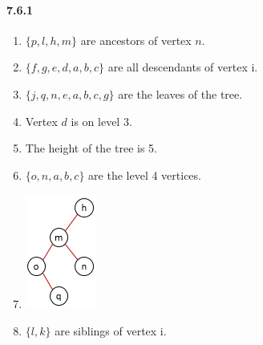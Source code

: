 \documentclass[11pt, letterpaper, twocolumn, fleqn]{article}
\begin{document}
\paragraph{7.6.1}
\begin{enumerate}
  \item $\{p,l,h,m\}$ are ancestors of vertex $n$.
  \item $\{f,g,e,d,a,b,c\}$ are all descendants of vertex i.
  \item $\{j,q,n,e,a,b,c,g\}$ are the leaves of the tree.
  \item Vertex $d$ is on level 3.
  \item The height of the tree is 5.
  \item $\{o,n,a,b,c\}$ are the level 4 vertices.
  \item \includegraphics{761g}
  \item $\{l,k\}$ are siblings of vertex i.
\end{enumerate}
\end{document}
